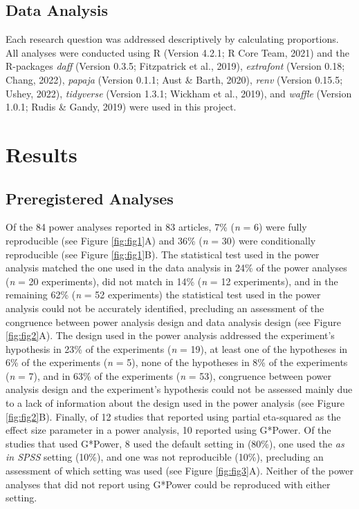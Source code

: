 \documentclass[
  man, donotrepeattitle,mask,floatsintext]{apa7}
\begin{document}
\hypertarget{data-analysis}{%
\subsection{Data Analysis}\label{data-analysis}}

Each research question was addressed descriptively by calculating proportions. All analyses were conducted using R (Version 4.2.1; R Core Team, 2021) and the R-packages \emph{daff} (Version 0.3.5; Fitzpatrick et al., 2019), \emph{extrafont} (Version 0.18; Chang, 2022), \emph{papaja} (Version 0.1.1; Aust \& Barth, 2020), \emph{renv} (Version 0.15.5; Ushey, 2022), \emph{tidyverse} (Version 1.3.1; Wickham et al., 2019), and \emph{waffle} (Version 1.0.1; Rudis \& Gandy, 2019) were used in this project.

\hypertarget{results}{%
\section{Results}\label{results}}

\hypertarget{preregistered-analyses}{%
\subsection{Preregistered Analyses}\label{preregistered-analyses}}

Of the 84 power analyses reported in 83 articles, 7\% (\emph{n} = 6) were fully reproducible (see Figure \ref{fig:fig1}A) and 36\% (\emph{n} = 30) were conditionally reproducible (see Figure \ref{fig:fig1}B). The statistical test used in the power analysis matched the one used in the data analysis in 24\% of the power analyses (\emph{n} = 20 experiments), did not match in 14\% (\emph{n} = 12 experiments), and in the remaining 62\% (\emph{n} = 52 experiments) the statistical test used in the power analysis could not be accurately identified, precluding an assessment of the congruence between power analysis design and data analysis design (see Figure \ref{fig:fig2}A). The design used in the power analysis addressed the experiment's hypothesis in 23\% of the experiments (\emph{n} = 19), at least one of the hypotheses in 6\% of the experiments (\emph{n} = 5), none of the hypotheses in 8\% of the experiments (\emph{n} = 7), and in 63\% of the experiments (\emph{n} = 53), congruence between power analysis design and the experiment's hypothesis could not be assessed mainly due to a lack of information about the design used in the power analysis (see Figure \ref{fig:fig2}B). Finally, of 12 studies that reported using partial eta-squared as the effect size parameter in a power analysis, 10 reported using G*Power. Of the studies that used G*Power, 8 used the default setting in (80\%), one used the \emph{as in SPSS} setting (10\%), and one was not reproducible (10\%), precluding an assessment of which setting was used (see Figure \ref{fig:fig3}A). Neither of the power analyses that did not report using G*Power could be reproduced with either setting.
\end{document}
